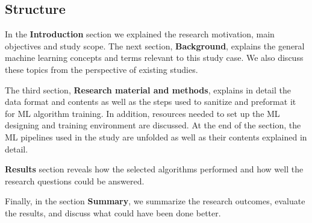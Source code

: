

\subsection{Structure}\label{subsec:intro-structure}

In the \textbf{Introduction} section
we explained the research motivation,
main objectives and study scope.
The next section, \textbf{Background},
explains %
the general machine learning concepts
and terms relevant to this study case.
We also discuss these topics from the perspective of
existing studies. %

The third section,
\textbf{Research material and methods},
explains in detail the data format and contents
as well as the steps used to sanitize and preformat it
for ML algorithm training.
In addition,
resources needed to set up the ML designing and training environment
are discussed.
At the end of the section,
the ML pipelines used in the study are unfolded
as well as their contents explained in detail.

\textbf{Results} section reveals how the selected algorithms performed
and how well the research questions could be answered.

Finally,
in the section \textbf{Summary},
we summarize the research outcomes,
evaluate the results,
and discuss what could have been done better. %

\clearpage


